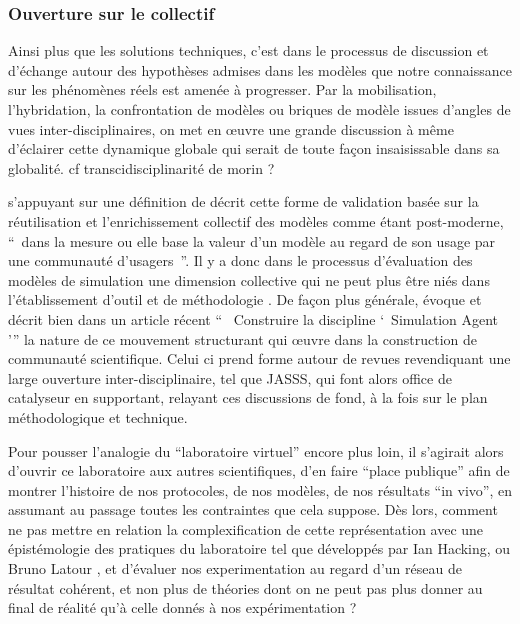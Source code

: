 
\subsubsection{Ouverture sur le collectif}

Ainsi plus que les solutions techniques, c'est dans le processus de discussion et d'échange autour des hypothèses admises dans les modèles que notre connaissance sur les phénomènes réels est amenée à progresser. Par la mobilisation, l'hybridation, la confrontation de modèles ou briques de modèle issues d'angles de vues inter-disciplinaires,  on met en œuvre une grande discussion à même d'éclairer cette dynamique globale qui serait de toute façon insaisissable dans sa globalité. {cf transcidisciplinarité de morin ?}

\autocite{Rouchier2013} s'appuyant sur une définition de  décrit cette forme de validation basée sur la réutilisation et l'enrichissement collectif des modèles comme étant post-moderne, \enquote{ dans la mesure ou elle base la valeur d'un modèle au regard de son usage par une communauté d'usagers }. Il y a donc dans le processus d'évaluation des modèles de simulation une dimension collective qui ne peut plus être niés dans l'établissement d'outil et de méthodologie . De façon plus générale, \autocite{Rouchier2013} évoque et décrit bien dans un article récent \enquote{  Construire la discipline \enquote{ Simulation Agent }} la nature de ce mouvement structurant qui œuvre dans la construction de communauté scientifique. Celui ci prend forme autour de revues revendiquant une large ouverture inter-disciplinaire, tel que JASSS, qui font alors office de catalyseur en supportant, relayant ces discussions de fond, à la fois sur le plan méthodologique et technique.

Pour pousser l'analogie du \enquote{laboratoire virtuel} encore plus loin, il s'agirait alors d'ouvrir ce laboratoire aux autres scientifiques, d'en faire \enquote{place publique} afin de montrer l'histoire de nos protocoles, de nos modèles, de nos résultats \foreignquote{latin}{in vivo}, en assumant au passage toutes les contraintes que cela suppose. Dès lors, comment ne pas mettre en relation la complexification de cette représentation avec une épistémologie des pratiques du laboratoire tel que développés par Ian Hacking, ou Bruno Latour , et d'évaluer nos experimentation au regard d'un réseau de résultat cohérent, et non plus de théories dont on ne peut pas plus donner au final de réalité qu'à celle donnés à nos expérimentation ?

